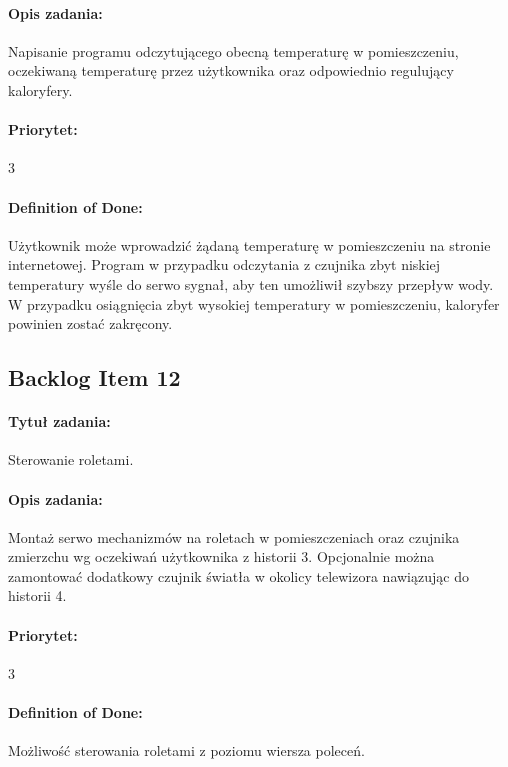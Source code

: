 \paragraph{Opis zadania:} 
Napisanie programu odczytującego obecną temperaturę w pomieszczeniu, oczekiwaną temperaturę przez użytkownika oraz odpowiednio regulujący kaloryfery.

\paragraph{Priorytet:}
3

\paragraph{Definition of Done:} 
Użytkownik może wprowadzić żądaną temperaturę w pomieszczeniu na stronie internetowej. Program w przypadku odczytania z czujnika zbyt niskiej temperatury wyśle do serwo sygnał, aby ten umożliwił szybszy przepływ wody. W przypadku osiągnięcia zbyt wysokiej temperatury w pomieszczeniu, kaloryfer powinien zostać zakręcony. 


	
	\subsection{Backlog Item 12}
	\paragraph{Tytuł zadania:}
	Sterowanie roletami.
	
	\paragraph{Opis zadania:} 
	Montaż serwo mechanizmów na roletach w pomieszczeniach oraz czujnika zmierzchu wg oczekiwań użytkownika z historii 3. Opcjonalnie można zamontować dodatkowy czujnik światła w okolicy telewizora nawiązując do historii 4.
	
	\paragraph{Priorytet:}
	3
	
	\paragraph{Definition of Done:}
	Możliwość sterowania roletami z poziomu wiersza poleceń.


